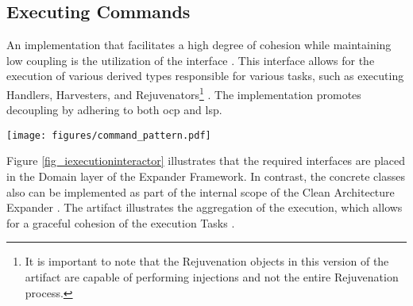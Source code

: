 \subsection{Executing Commands} \label{subsec_IExecutionInteractorObject}

An implementation that facilitates a high degree of cohesion while maintaining low
coupling is the utilization of the  interface
\parencite{koks_iexecutioninteractor_2023}. This interface allows for the execution of
various derived types responsible for various tasks, such as executing Handlers,
Harvesters, and Rejuvenators\footnote{It is important to note that the Rejuvenation
objects in this version of the artifact are capable of performing injections and not the
entire Rejuvenation process.} \parencites{koks_expandentitieshandlerinteractor_2023,
koks_regionharvesterinteractor_2023, koks_regionrejuvenatorinteractor_2023}. The
implementation promotes decoupling by adhering to both \gls{ocp} and \gls{lsp}.

\begin{figure*}[htbp]
    \centering
    \texttt{[image: figures/command\_pattern.pdf]}
    \caption[Low coupling with ]{Low coupling with }
    \label{fig_iexecutioninteractor}
  \end{figure*}


Figure \ref{fig_iexecutioninteractor} illustrates that the required interfaces are placed
in the Domain layer of the Expander Framework. In contrast, the concrete classes also can
be implemented as part of the internal scope of the Clean Architecture Expander
\parencite{koks_migrationharvesterinteractor_2023}. The artifact illustrates the
aggregation of the execution, which allows for a graceful cohesion of the execution Tasks
\parencite{koks_codegeneratorinteractor_2023}.
